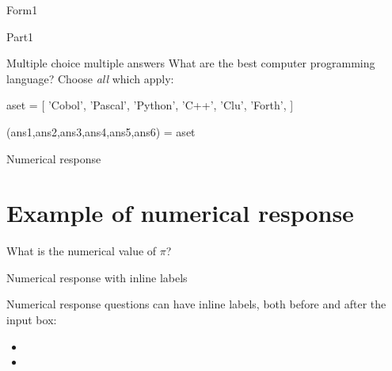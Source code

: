 \begin{edXchapter}{Form1}
\begin{edXsection}{Part1}
\begin{edXvertical}
\begin{edXproblem}{Multiple choice multiple answers}{}
What are the best computer programming language?  Choose {\em all} which apply:

\begin{edXscript}

aset = [ 'Cobol',
         'Pascal',
         'Python',
         'C++',
         'Clu',
         'Forth',
      ]

(ans1,ans2,ans3,ans4,ans5,ans6) = aset

\end{edXscript}


\end{edXproblem}

\end{edXvertical}


\begin{edXvertical}


\begin{edXproblem}{Numerical response}

\section{Example of numerical response}  

What is the numerical value of $\pi$?


\end{edXproblem}


\begin{edXproblem}{Numerical response with inline labels}{}

Numerical response questions can have inline labels, both before and after the input box:

\begin{itemize}

\item  

     

\item  


\end{itemize}
\end{edXproblem}
\end{edXvertical}
\end{edXsection}
\end{edXchapter}
